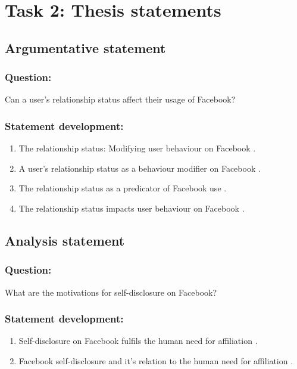 \documentclass[12pt,a4paper]{report}
\begin{document}
\newpage
\section*{\textsf{Task 2: Thesis statements}}

\subsection*{\textsf{Argumentative statement}}

\subsubsection*{\textsf{Question:}}

Can a user's relationship status affect their usage of Facebook?

\subsubsection*{\textsf{Statement development:}}
\begin{enumerate}
\item The relationship status: Modifying user behaviour on Facebook \citep{McAndrew2012}.
\item A user's relationship status as a behaviour modifier on Facebook \citep{McAndrew2012}.
\item The relationship status as a predicator of Facebook use \citep{McAndrew2012}.
\item The relationship status impacts user behaviour on Facebook \citep{McAndrew2012}.
\end{enumerate}

\subsection*{\textsf{Analysis statement}}

\subsubsection*{\textsf{Question:}}

What are the motivations for self-disclosure on Facebook?

\subsubsection*{\textsf{Statement development:}}
\begin{enumerate}
\item Self-disclosure on Facebook fulfils the human need for affiliation \citep{Park2011}.
\item Facebook self-disclosure and it's relation to the human need for affiliation \citep{Park2011}.
\end{enumerate}
\end{document}
